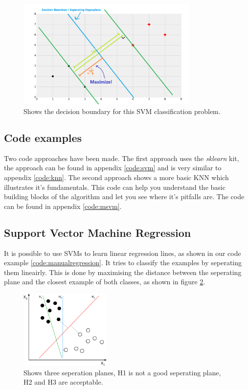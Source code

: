 \begin{figure}
\centering
\includegraphics[width=0.8\textwidth]{images/svm-decision-boundary.png}
\caption{\label{fig:svm-decision-boundary} Shows the decision boundary for this SVM classification problem.}
\end{figure}

\subsection{Code examples}
Two code approaches have been made. The first approach uses the \emph{sklearn} kit, the approach can be found in appendix \ref{code:svm} and is very similar to appendix \ref{code:knn}. The second approach shows a more basic KNN which illustrates it's fundamentals. This code can help you understand the basic building blocks of the algorithm and let you see where it's pitfalls are. The code can be found in appendix \ref{code:msvm}.

\subsection{Support Vector Machine Regression}
It is possible to use SVMs to learn linear regression lines, as shown in our code example \ref{code:manualregression}. It tries to classify the examples by seperating them lineairly. This is done by maximising the distance between the seperating plane and the closest example of both classes, as shown in figure \ref{fig:svm}.

\begin{figure}
\centering
\includegraphics[width=0.4\textwidth]{images/svm.png}
\caption{\label{fig:svm} Shows three seperation planes, H1 is not a good seperating plane, H2 and H3 are acceptable.}
\end{figure}
